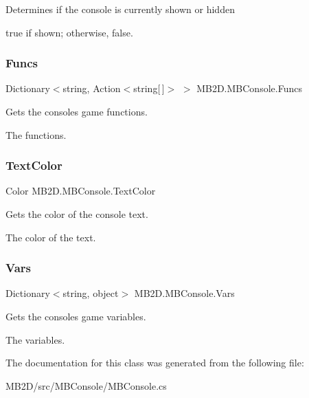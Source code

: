Determines if the console is currently shown or hidden 

{\ttfamily true} if shown; otherwise, {\ttfamily false}.\hypertarget{class_m_b2_d_1_1_m_b_console_a11915e9941920f0fbe8457b90dcdcfc7}{}\label{class_m_b2_d_1_1_m_b_console_a11915e9941920f0fbe8457b90dcdcfc7} 
\subsubsection{\texorpdfstring{Funcs}{Funcs}}
{\footnotesize\ttfamily Dictionary$<$string, Action$<$string\mbox{[}$\,$\mbox{]}$>$ $>$ M\+B2\+D.\+M\+B\+Console.\+Funcs\hspace{0.3cm}{\ttfamily [get]}}



Gets the consoles game functions. 

The functions.\hypertarget{class_m_b2_d_1_1_m_b_console_a41089b46b4c440409ccc0018b8a4c822}{}\label{class_m_b2_d_1_1_m_b_console_a41089b46b4c440409ccc0018b8a4c822} 
\subsubsection{\texorpdfstring{Text\+Color}{TextColor}}
{\footnotesize\ttfamily Color M\+B2\+D.\+M\+B\+Console.\+Text\+Color\hspace{0.3cm}{\ttfamily [get]}}



Gets the color of the console text. 

The color of the text.\hypertarget{class_m_b2_d_1_1_m_b_console_ac36d5c946f44dc58c82b9ade6c5f689c}{}\label{class_m_b2_d_1_1_m_b_console_ac36d5c946f44dc58c82b9ade6c5f689c} 
\subsubsection{\texorpdfstring{Vars}{Vars}}
{\footnotesize\ttfamily Dictionary$<$string, object$>$ M\+B2\+D.\+M\+B\+Console.\+Vars\hspace{0.3cm}{\ttfamily [get]}}



Gets the consoles game variables. 

The variables.

The documentation for this class was generated from the following file\+:\begin{DoxyCompactItemize}
\item 
M\+B2\+D/src/\+M\+B\+Console/M\+B\+Console.\+cs\end{DoxyCompactItemize}
